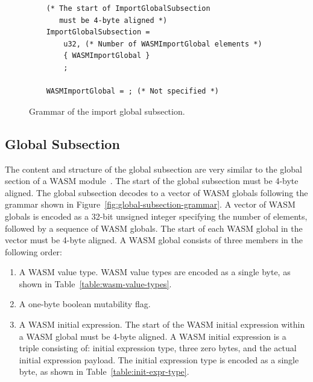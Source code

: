 \documentclass{article}
\begin{document}
\begin{figure}[H]
\begin{verbatim}
    (* The start of ImportGlobalSubsection
       must be 4-byte aligned *)
    ImportGlobalSubsection =
        u32, (* Number of WASMImportGlobal elements *)
        { WASMImportGlobal }
        ;

    WASMImportGlobal = ; (* Not specified *)
\end{verbatim}
\caption{Grammar of the import global subsection.}
\label{fig:import-global-subsection-grammar}
\end{figure}

\subsection{Global Subsection}
The content and structure of the global subsection are very similar to the global section of a WASM module~\cite[Sec.~5.5.9]{webassembly2019core}.
The start of the global subsection must be 4-byte aligned.
The global subsection decodes to a vector of WASM globals following the grammar shown in Figure~\ref{fig:global-subsection-grammar}.
A vector of WASM globals is encoded as a 32-bit unsigned integer specifying the number of elements, followed by a sequence of WASM globals.
The start of each WASM global in the vector must be 4-byte aligned.
A WASM global consists of three members in the following order:
\begin{enumerate}
    \item A WASM value type. WASM value types are encoded as a single byte, as shown in Table~\ref{table:wasm-value-types}.
    \item A one-byte boolean mutability flag.
    \item A WASM initial expression.
    The start of the WASM initial expression within a WASM global must be 4-byte aligned.
    A WASM initial expression is a triple consisting of: initial expression type, three zero bytes, and the actual initial expression payload.
    The initial expression type is encoded as a single byte, as shown in Table~\ref{table:init-expr-type}.
\end{enumerate}
\end{document}
